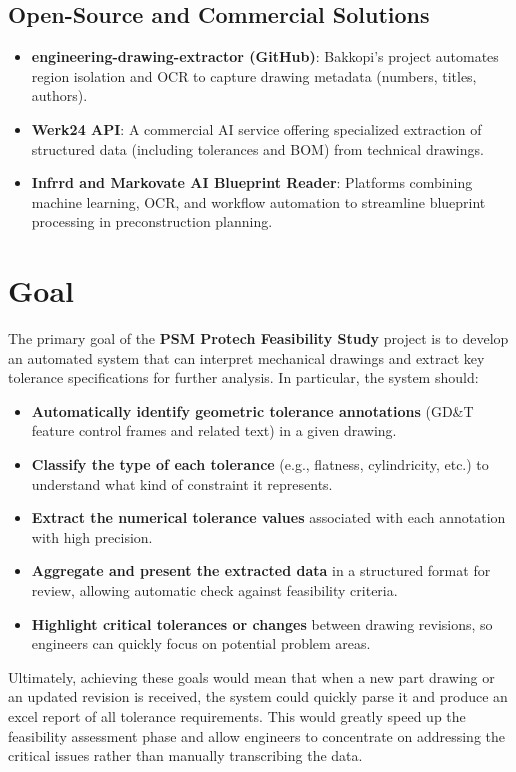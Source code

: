 \documentclass[11pt,a4paper]{article}
\begin{document}
\subsection*{Open-Source and Commercial Solutions}
\begin{itemize}
  \item \textbf{engineering-drawing-extractor (GitHub)}: Bakkopi’s project automates region isolation
    and OCR to capture drawing metadata (numbers, titles, authors).
  \item \textbf{Werk24 API}: A commercial AI service offering specialized extraction of structured
    data (including tolerances and BOM) from technical drawings.
  \item \textbf{Infrrd and Markovate AI Blueprint Reader}: Platforms combining machine learning,
    OCR, and workflow automation to streamline blueprint processing in preconstruction planning.
\end{itemize}


\section{Goal}
The primary goal of the \textbf{PSM Protech Feasibility Study} project is to develop an automated system that can interpret mechanical drawings and extract key tolerance specifications for further analysis. In particular, the system should:
\begin{itemize}
  \item \textbf{Automatically identify geometric tolerance annotations} (GD\&T feature control frames and related text) in a given drawing.
  \item \textbf{Classify the type of each tolerance} (e.g., flatness, cylindricity, etc.) to understand what kind of constraint it represents.
  \item \textbf{Extract the numerical tolerance values} associated with each annotation with high precision.
  \item \textbf{Aggregate and present the extracted data} in a structured format for review, allowing automatic check against feasibility criteria.
  \item \textbf{Highlight critical tolerances or changes} between drawing revisions, so engineers can quickly focus on potential problem areas.
\end{itemize}

Ultimately, achieving these goals would mean that when a new part drawing or an updated revision is received, the system could quickly parse it and produce an excel report of all tolerance requirements. This would greatly speed up the feasibility assessment phase and allow engineers to concentrate on addressing the critical issues rather than manually transcribing the data.
\end{document}

